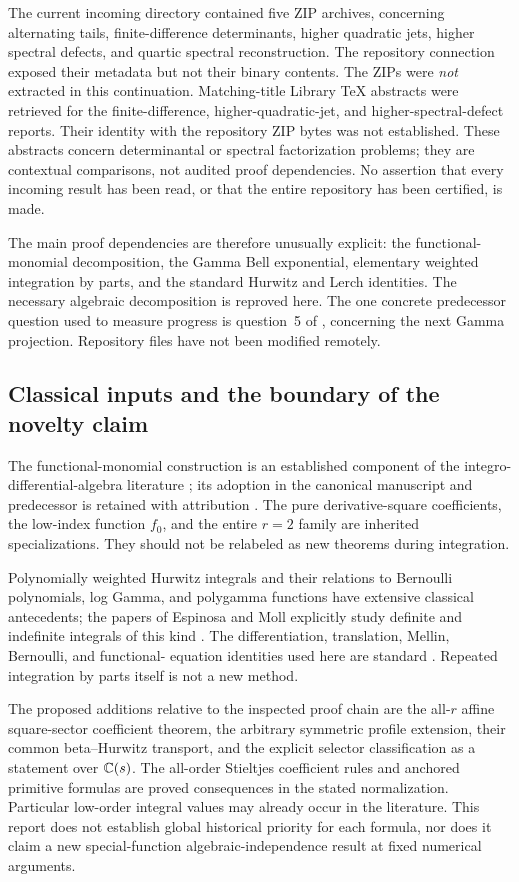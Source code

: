 \documentclass[11pt,letterpaper]{article}
\numberwithin{equation}{section}
\theoremstyle{definition}\newtheorem{definition}[theorem]{Definition}
\theoremstyle{remark}\newtheorem{remark}[theorem]{Remark}
\begin{document}
The current incoming directory contained five ZIP archives, concerning
alternating tails, finite-difference determinants, higher quadratic jets,
higher spectral defects, and quartic spectral reconstruction. The
repository connection exposed their metadata but not their binary
contents. The ZIPs were \emph{not} extracted in this continuation.
Matching-title Library TeX abstracts were retrieved for the
finite-difference, higher-quadratic-jet, and higher-spectral-defect
reports. Their identity with the repository ZIP bytes was not
established. These abstracts concern determinantal or spectral
factorization problems; they are contextual comparisons, not audited
proof dependencies. No assertion that every incoming result has been
read, or that the entire repository has been certified, is made.

The main proof dependencies are therefore unusually explicit: the
functional-monomial decomposition, the Gamma Bell exponential, elementary
weighted integration by parts, and the standard Hurwitz and Lerch
identities. The necessary algebraic decomposition is reproved here.
The one concrete predecessor question used to measure progress is
question~5 of \cite[Section~8]{HTG}, concerning the next Gamma
projection. Repository files have not been modified remotely.

\subsection{Classical inputs and the boundary of the novelty claim}
The functional-monomial construction is an established component of the
integro-differential-algebra literature \cite{GRR}; its adoption in the
canonical manuscript and predecessor is retained with attribution
\cite{Manuscript,HTG}. The pure derivative-square coefficients, the
low-index function $f_0$, and the entire $r=2$ family are inherited
specializations. They should not be relabeled as new theorems during
integration.

Polynomially weighted Hurwitz integrals and their relations to
Bernoulli polynomials, log Gamma, and polygamma functions have extensive
classical antecedents; the papers of Espinosa and Moll explicitly
study definite and indefinite integrals of this kind \cite{EM1,EM2}.
The differentiation, translation, Mellin, Bernoulli, and functional-
equation identities used here are standard \cite{DLMFzeta,DLMFpsi,
DLMFlerch,DLMFBernoulli,DLMFintegers}. Repeated integration by parts
itself is not a new method.

The proposed additions relative to the inspected proof chain are the
all-$r$ affine square-sector coefficient theorem, the arbitrary symmetric
profile extension, their common beta--Hurwitz transport, and the
explicit selector classification as a statement over $\mathbb C(s)$. The
all-order Stieltjes coefficient rules and anchored primitive formulas
are proved consequences in the stated normalization. Particular
low-order integral values may already occur in the literature.
This report does not establish global historical priority for each
formula, nor does it claim a new special-function algebraic-independence
result at fixed numerical arguments.
\end{document}
